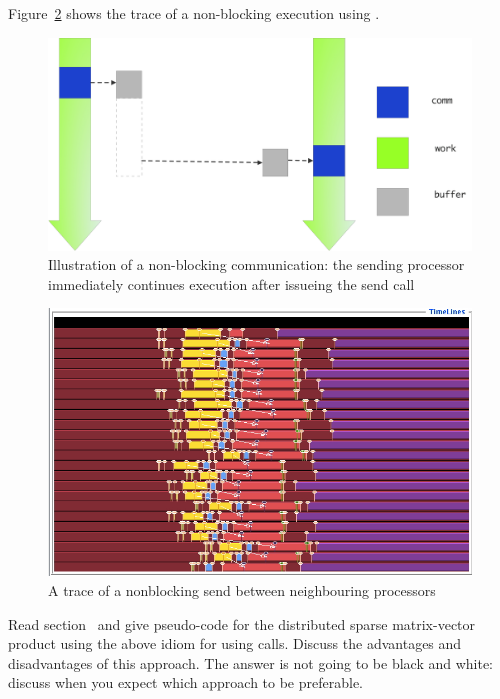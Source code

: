 Figure~\ref{fig:jump-nonblock} shows the trace of a non-blocking execution
using .
\begin{figure}[ht]
\includegraphics[scale=.1]{graphics-public/send-nonblocking}
\caption{Illustration of a non-blocking communication: the sending processor immediately continues execution after issueing the send call}
\label{fig:send-nonblocking}
\end{figure}
\begin{figure}[ht]
\includegraphics[scale=.4]{graphics-public/linear-nonblock}
\caption{A trace of a nonblocking send between neighbouring processors}
\label{fig:jump-nonblock}
\end{figure}

\begin{exercise}
  Read section~ and give pseudo-code for the
    distributed sparse matrix-vector product using the above idiom for
    using  calls. Discuss the advantages and
    disadvantages of this approach. The answer is not going to be
    black and white: discuss when you expect which approach to be
    preferable.
\end{exercise}

